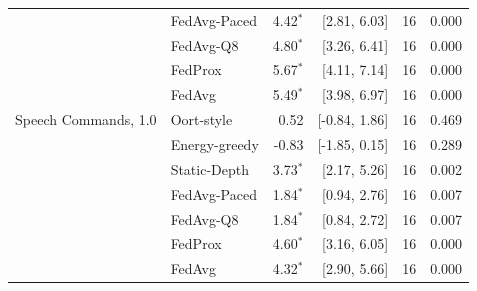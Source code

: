 \begin{tabular}{@{}llrrrr@{}}
 & FedAvg-Paced & 4.42$^{*}$ & [2.81, 6.03] & 16 & 0.000\\
 & FedAvg-Q8 & 4.80$^{*}$ & [3.26, 6.41] & 16 & 0.000\\
 & FedProx & 5.67$^{*}$ & [4.11, 7.14] & 16 & 0.000\\
 & FedAvg & 5.49$^{*}$ & [3.98, 6.97] & 16 & 0.000\\
\midrule
Speech Commands, 1.0 & Oort-style & 0.52 & [-0.84, 1.86] & 16 & 0.469\\
 & Energy-greedy & -0.83 & [-1.85, 0.15] & 16 & 0.289\\
 & Static-Depth & 3.73$^{*}$ & [2.17, 5.26] & 16 & 0.002\\
 & FedAvg-Paced & 1.84$^{*}$ & [0.94, 2.76] & 16 & 0.007\\
 & FedAvg-Q8 & 1.84$^{*}$ & [0.84, 2.72] & 16 & 0.007\\
 & FedProx & 4.60$^{*}$ & [3.16, 6.05] & 16 & 0.000\\
 & FedAvg & 4.32$^{*}$ & [2.90, 5.66] & 16 & 0.000\\
\bottomrule
\end{tabular}